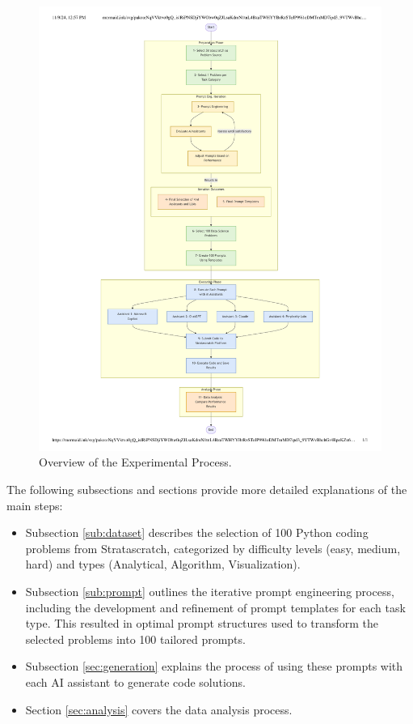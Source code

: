 \documentclass[conference]{IEEEtran}
\begin{document}
\begin{figure}[H]
    \centering
    \includegraphics[width=0.9\linewidth]{figures/mermaid-fluxogram.pdf}
    \caption{Overview of the Experimental Process.}
    \label{fig:overview}
\end{figure}

The following subsections and sections provide more detailed explanations of the main steps:
\begin{itemize}
    \item Subsection \ref{sub:dataset} describes the selection of 100 Python coding problems from Stratascratch, categorized by difficulty levels (easy, medium, hard) and types (Analytical, Algorithm, Visualization).
    \item Subsection \ref{sub:prompt} outlines the iterative prompt engineering process, including the development and refinement of prompt templates for each task type. This resulted in optimal prompt structures used to transform the selected problems into 100 tailored prompts.
    \item Subsection \ref{sec:generation} explains the process of using these prompts with each AI assistant to generate code solutions.
    \item Section \ref{sec:analysis} covers the data analysis process.
\end{itemize}
\end{document}
